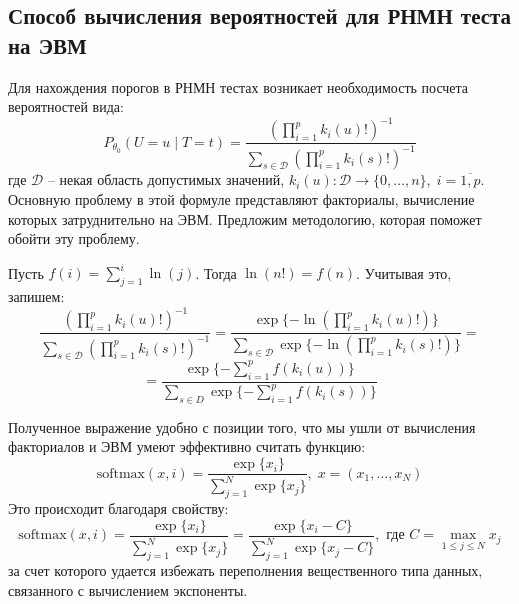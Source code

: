 \subsection{Способ вычисления вероятностей для РНМН теста
на ЭВМ}

Для нахождения порогов в РНМН тестах возникает необходимость
посчета вероятностей вида:
$$P_{\theta_0}(U=u \mid T=t)=\dfrac{(\prod_{i=1}^p k_i(u)!)^{-1}}
            {\sum_{s\in \mathcal{D}} (\prod_{i=1}^p k_i(s)!)^{-1}}$$
где $\mathcal{D}$ -- некая область допустимых значений,
$k_i(u):\mathcal{D} \to \{0,\ldots,n\}, \; i=\overline{1,p}$.
Основную проблему в этой формуле представляют 
факториалы, вычисление которых затруднительно на ЭВМ. 
Предложим методологию, которая поможет обойти эту проблему.

    Пусть $f(i)=\sum_{j=1}^{i} \ln(j)$. Тогда $\ln(n!)=f(n)$.
    Учитывая это, запишем:
    $$
    \dfrac{(\prod_{i=1}^p k_i(u)!)^{-1}}
            {\sum_{s\in \mathcal{D}} (\prod_{i=1}^p k_i(s)!)^{-1}}=
    \dfrac{\exp\{-\ln(\prod_{i=1}^p k_i(u)!)\}}
    {\sum_{s\in \mathcal{D}} \exp \{-\ln(\prod_{i=1}^p k_i(s)!)\}}=
    $$
    $$
    = \dfrac{\exp \{ -\sum_{i=1}^p f(k_i(u)) \}}
    {\sum_{s \in D} \exp \{ -\sum_{i=1}^p f(k_i(s)) \}}
    $$
    
    Полученное выражение удобно с позиции того, что
    мы ушли от вычисления факториалов и ЭВМ умеют 
    эффективно считать функцию:
    $$
    \text{softmax}(x,i)=\dfrac{\exp\{x_i\}}{\sum_{j=1}^{N} \exp\{x_j\}}, \; x=(x_1,\ldots,x_N)
    $$
    Это происходит благодаря свойству:
    $$
    \text{softmax}(x,i)=\dfrac{\exp\{x_i\}}{\sum_{j=1}^{N} \exp\{x_j\}} = \dfrac{\exp\{x_i - C\}}{\sum_{j=1}^{N} \exp\{x_j - C\}}
    , \text{ где } C=\max_{1\leq j \leq N} x_j
    $$
    за счет которого удается избежать переполнения вещественного типа данных, 
    связанного с вычислением экспоненты.

